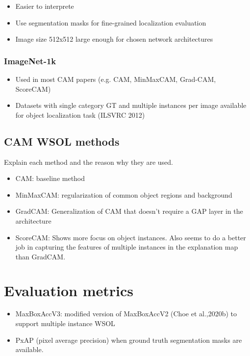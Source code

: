 \begin{itemize}
    \item Easier to interprete
    \item Use segmentation masks for fine-grained localization evaluation
    \item Image size 512x512 large enough for chosen network architectures
\end{itemize}

\subsubsection{ImageNet-1k} 
\begin{itemize}
    \item Used in most CAM papers (e.g. CAM, MinMaxCAM, Grad-CAM, ScoreCAM)
    \item Datasets with single category GT and multiple instances per image available for object localization task (ILSVRC 2012)
\end{itemize}

\subsection{CAM WSOL methods}
Explain each method and the reason why they are used.
\begin{itemize}
    \item CAM: baseline method
    \item MinMaxCAM: regularization of common object regions and background
    \item GradCAM: Generalization of CAM that doesn’t require a GAP layer in the architecture
    \item ScoreCAM: Shows more focus on object instances. Also seems to do a better job in capturing the features of multiple instances in the explanation map than GradCAM.
\end{itemize}

\section{Evaluation metrics}
\begin{itemize}
    \item MaxBoxAccV3: modified version of MaxBoxAccV2 (Choe et al.,2020b) to support multiple instance WSOL
    \item PxAP (pixel average precision) when ground truth segmentation masks are available.
\end{itemize}

